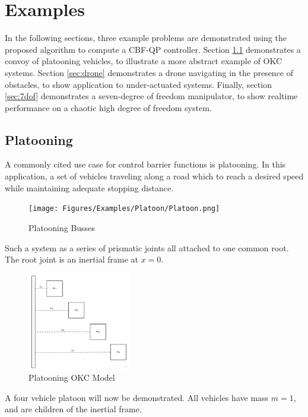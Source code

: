 \chapter{Examples}

In the following sections, three example problems are demonstrated using the proposed algorithm to compute a CBF-QP controller. Section \ref{sec:platooning} demonstrates a convoy of platooning vehicles, to illustrate a more abstract example of OKC systems. Section \ref{sec:drone} demonstrates a drone navigating in the presence of obstacles, to show application to under-actuated systems. Finally, section \ref{sec:7dof} demonstrates a seven-degree of freedom manipulator, to show realtime performance on a chaotic high degree of freedom system.



\section{Platooning} \label{sec:platooning}
\noindent A commonly cited use case for control barrier functions is platooning. In this application, a set of vehicles traveling along a road which to reach a desired speed while maintaining adequate stopping distance. 
\begin{figure}[H]
    \centering
    \texttt{[image: Figures/Examples/Platoon/Platoon.png]}
    \caption{Platooning Busses}
    \label{fig:platoon_diag}
\end{figure}
\noindent Such a system as a series of prismatic joints all attached to one common root. The root joint is an inertial frame at $x=0$.  

\begin{figure}[H]
    \centering
    \includegraphics[width=0.4\textwidth]{Figures/Examples/Platoon/PlatoonNE.png}
    \caption{Platooning OKC Model}
    \label{fig:platoon_diag_2}
\end{figure}
\noindent A four vehicle platoon will now be demonstrated. All vehicles have mass $m = 1$, and are children of the inertial frame. 

